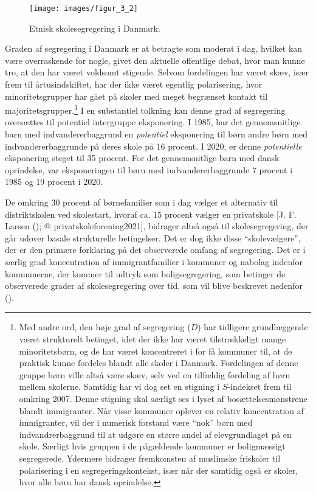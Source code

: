 \documentclass[
]{book}
\begin{document}
\begin{figure}
\texttt{[image: images/figur\_3\_2]} \caption{Etnisk skolesegregering i Danmark.}\label{fig:fig-4-2}
\end{figure}

Graden af segregering i Danmark er at betragte som moderat i dag, hvilket kan være overraskende for nogle, givet den aktuelle offentlige debat, hvor man kunne tro, at den har været voldsomt stigende. Selvom fordelingen har været skæv, især frem til årtusindskiftet, har der ikke været egentlig polarisering, hvor minoritetsgrupper har gået på skoler med meget begrænset kontakt til majoritetsgrupper.\footnote{Med andre ord, den høje grad af segregering (\(D\)) har tidligere grundlæggende været strukturelt betinget, idet der ikke har været tilstrækkeligt mange minoritetsbørn, og de har været koncentreret i for få kommuner til, at de praktisk kunne fordeles blandt alle skoler i Danmark. Fordelingen af denne gruppe børn ville altså være skæv, selv ved en tilfældig fordeling af børn mellem skolerne. Samtidig har vi dog set en stigning i \(S\)-indekset frem til omkring 2007. Denne stigning skal særligt ses i lyset af bosættelsesmønstrene blandt immigranter. Når visse kommuner oplever en relativ koncentration af immigranter, vil der i numerisk forstand være ``nok'' børn med indvandrerbaggrund til at udgøre en større andel af elevgrundlaget på en skole. Særligt hvis gruppen i de pågældende kommuner er boligmæssigt segregerede. Ydermere bidrager fremkomsten af muslimske friskoler til polarisering i en segregeringskontekst, især når der samtidig også er skoler, hvor alle børn har dansk oprindelse.} I en substantiel tolkning kan denne grad af segregering oversættes til potentiel intergruppe eksponering. I 1985, har det gennemsnitlige barn med indvandererbaggrund en \emph{potentiel} eksponering til børn andre børn med indvandererbaggrunde på deres skole på 16 procent. I 2020, er denne \emph{potentielle} eksponering steget til 35 procent. For det gennemsnitlige barn med dansk oprindelse, var eksponeringen til børn med indvandererbaggrunde 7 procent i 1985 og 19 procent i 2020.

De omkring 30 procent af børnefamilier som i dag vælger et alternativ til distriktskolen ved skolestart, hvoraf ca. 15 procent vælger en privatskole {[}J. F. Larsen (); @ privatskoleforening2021{]}, bidrager altså også til skolesegregering, der går udover basale strukturelle betingelser. Det er dog ikke disse ``skolevælgere'', der er den primære forklaring på det observerede omfang af segregering. Det er i særlig grad koncentration af immigrantfamilier i kommuner og nabolag indenfor kommunerne, der kommer til udtryk som boligsegregering, som betinger de observerede grader af skolesegregering over tid, som vil blive beskrevet nedenfor ().
\end{document}
